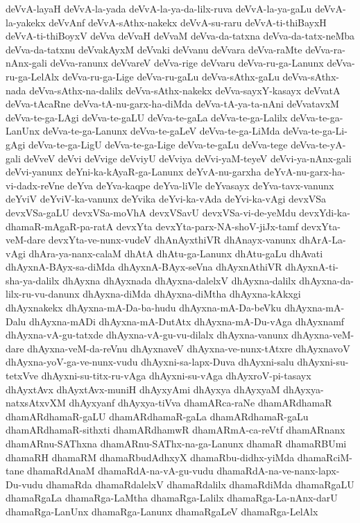 {deVvA-layaH
deVvA-la-yada
deVvA-la-ya-da-lilx-ruva
deVvA-la-ya-gaLu
deVvA-la-yakekx
deVvAnf
deVvA-sAthx-nakekx
deVvA-su-raru
deVvA-ti-thiBayxH
deVvA-ti-thiBoyxV
deVva
deVvaH
deVvaM
deVva-da-tatxna
deVva-da-tatx-neMba
deVva-da-tatxnu
deVvakAyxM
deVvaki
deVvanu
deVvara
deVva-raMte
deVva-ra-nAnx-gali
deVva-ranunx
deVvareV
deVva-rige
deVvaru
deVva-ru-ga-Lanunx
deVva-ru-ga-LelAlx
deVva-ru-ga-Lige
deVva-ru-gaLu
deVva-sAthx-gaLu
deVva-sAthx-nada
deVva-sAthx-na-dalilx
deVva-sAthx-nakekx
deVva-sayxY-kasayx
deVvatA
deVva-tAcaRne
deVva-tA-nu-garx-ha-diMda
deVva-tA-ya-ta-nAni
deVvatavxM
deVva-te-ga-LAgi
deVva-te-gaLU
deVva-te-gaLa
deVva-te-ga-Lalilx
deVva-te-ga-LanUnx
deVva-te-ga-Lanunx
deVva-te-gaLeV
deVva-te-ga-LiMda
deVva-te-ga-Li-gAgi
deVva-te-ga-LigU
deVva-te-ga-Lige
deVva-te-gaLu
deVva-tege
deVva-te-yA-gali
deVveV
deVvi
deVvige
deVviyU
deVviya
deVvi-yaM-teyeV
deVvi-ya-nAnx-gali
deVvi-yanunx
deYni-ka-kAyaR-ga-Lanunx
deYvA-nu-garxha
deYvA-nu-garx-ha-vi-dadx-reVne
deYva
deYva-kaqpe
deYva-liVle
deYvasayx
deYva-tavx-vanunx
deYviV
deYviV-ka-vanunx
deYvika
deYvi-ka-vAda
deYvi-ka-vAgi
devxVSa
devxVSa-gaLU
devxVSa-moVhA
devxVSavU
devxVSa-vi-de-yeMdu
devxYdi-ka-dhamaR-mAgaR-pa-ratA
devxYta
devxYta-parx-NA-shoV-jiJx-tamf
devxYta-veM-dare
devxYta-ve-nunx-vudeV
dhAnAyxthiVR
dhAnayx-vanunx
dhArA-La-vAgi
dhAra-ya-nanx-calaM
dhAtA
dhAtu-ga-Lanunx
dhAtu-gaLu
dhAvati
dhAyxnA-BAyx-sa-diMda
dhAyxnA-BAyx-seVna
dhAyxnAthiVR
dhAyxnA-ti-sha-ya-dalilx
dhAyxna
dhAyxnada
dhAyxna-dalelxV
dhAyxna-dalilx
dhAyxna-da-lilx-ru-vu-danunx
dhAyxna-diMda
dhAyxna-diMtha
dhAyxna-kAkxgi
dhAyxnakekx
dhAyxna-mA-Da-ba-hudu
dhAyxna-mA-Da-beVku
dhAyxna-mA-Dalu
dhAyxna-mADi
dhAyxna-mA-DutAtx
dhAyxna-mA-Du-vAga
dhAyxnamf
dhAyxna-vA-gu-tatxde
dhAyxna-vA-gu-vu-dilalx
dhAyxna-vanunx
dhAyxna-veM-dare
dhAyxna-veM-da-reVnu
dhAyxnaveV
dhAyxna-ve-nunx-tAtxre
dhAyxnavoV
dhAyxna-yoV-ga-ve-nunx-vudu
dhAyxni-sa-lapx-Duva
dhAyxni-salu
dhAyxni-su-tetxVve
dhAyxni-su-titx-ru-vAga
dhAyxni-su-vAga
dhAyxroV-pi-tasayx
dhAyxtAvx
dhAyxtAvx-muniH
dhAyxyAmi
dhAyxya
dhAyxyaM
dhAyxya-natxsAtxvXM
dhAyxyanf
dhAyxya-tiVva
dhamARca-raNe
dhamARdhamaR
dhamARdhamaR-gaLU
dhamARdhamaR-gaLa
dhamARdhamaR-gaLu
dhamARdhamaR-sithxti
dhamARdhamwR
dhamARmA-ca-reVtf
dhamARnanx
dhamARnu-SAThxna
dhamARnu-SAThx-na-ga-Lanunx
dhamaR
dhamaRBUmi
dhamaRH
dhamaRM
dhamaRbudAdhxyX
dhamaRbu-didhx-yiMda
dhamaRciM-tane
dhamaRdAnaM
dhamaRdA-na-vA-gu-vudu
dhamaRdA-na-ve-nanx-lapx-Du-vudu
dhamaRda
dhamaRdalelxV
dhamaRdalilx
dhamaRdiMda
dhamaRgaLU
dhamaRgaLa
dhamaRga-LaMtha
dhamaRga-Lalilx
dhamaRga-La-nAnx-darU
dhamaRga-LanUnx
dhamaRga-Lanunx
dhamaRgaLeV
dhamaRga-LelAlx
}
